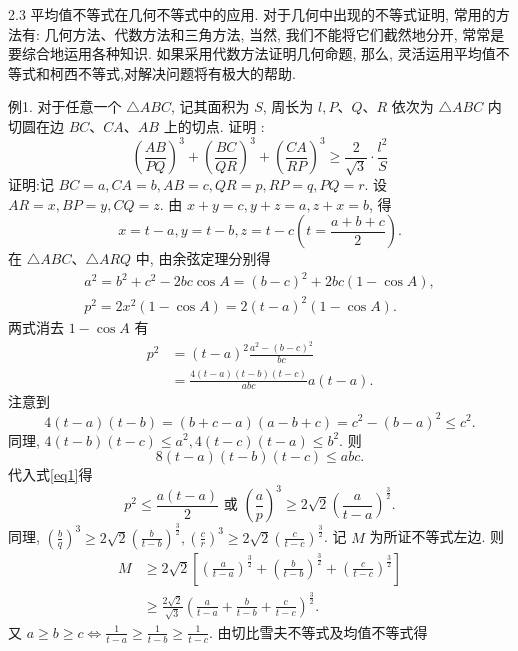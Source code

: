 
2.3 平均值不等式在几何不等式中的应用.
对于几何中出现的不等式证明, 常用的方法有: 几何方法、代数方法和三角方法, 当然, 我们不能将它们截然地分开, 常常是要综合地运用各种知识.
如果采用代数方法证明几何命题, 那么, 灵活运用平均值不等式和柯西不等式,对解决问题将有极大的帮助.



例1. 对于任意一个 $\triangle A B C$, 记其面积为 $S$, 周长为 $l, P 、 Q 、 R$ 依次为 $\triangle A B C$ 内切圆在边 $B C 、 C A 、 A B$ 上的切点.
证明 :
$$
\left(\frac{A B}{P Q}\right)^3+\left(\frac{B C}{Q R}\right)^3+\left(\frac{C A}{R P}\right)^3 \geqslant \frac{2}{\sqrt{3}} \cdot \frac{l^2}{S}
$$
证明:记 $B C=a, C A=b, A B=c, Q R=p, R P=q, P Q=r$. 设 $A R=x, B P=y, C Q=z$. 由 $x+y=c, y+z=a, z+x=b$, 得
$$
x=t-a, y=t-b, z=t-c\left(t=\frac{a+b+c}{2}\right) .
$$
在 $\triangle A B C 、 \triangle A R Q$ 中, 由余弦定理分别得
$$
\begin{gathered}
a^2=b^2+c^2-2 b c \cos A=(b-c)^2+2 b c(1-\cos A), \\
p^2=2 x^2(1-\cos A)=2(t-a)^2(1-\cos A) .
\end{gathered}
$$
两式消去 $1-\cos A$ 有
$$
\begin{aligned}
p^2 & =(t-a)^2 \frac{a^2-(b-c)^2}{b c} \\
& =\frac{4(t-a)(t-b)(t-c)}{a b c} a(t-a) . \label{eq1}
\end{aligned}
$$
注意到
$$
4(t-a)(t-b)=(b+c-a)(a-b+c)=c^2-(b-a)^2 \leqslant c^2 .
$$
同理, $4(t-b)(t-c) \leqslant a^2, 4(t-c)(t-a) \leqslant b^2$. 则
$$
8(t-a)(t-b)(t-c) \leqslant a b c .
$$
代入式\ref{eq1}得
$$
p^2 \leqslant \frac{a(t-a)}{2} \text { 或 }\left(\frac{a}{p}\right)^3 \geqslant 2 \sqrt{2}\left(\frac{a}{t-a}\right)^{\frac{3}{2}} .
$$
同理, $\left(\frac{b}{q}\right)^3 \geqslant 2 \sqrt{2}\left(\frac{b}{t-b}\right)^{\frac{3}{2}},\left(\frac{c}{r}\right)^3 \geqslant 2 \sqrt{2}\left(\frac{c}{t-c}\right)^{\frac{3}{2}}$. 记 $M$ 为所证不等式左边.
则
$$
\begin{aligned}
M & \geqslant 2 \sqrt{2}\left[\left(\frac{a}{t-a}\right)^{\frac{3}{2}}+\left(\frac{b}{t-b}\right)^{\frac{3}{2}}+\left(\frac{c}{t-c}\right)^{\frac{3}{2}}\right] \\
& \geqslant \frac{2 \sqrt{2}}{\sqrt{3}}\left(\frac{a}{t-a}+\frac{b}{t-b}+\frac{c}{t-c}\right)^{\frac{3}{2}} .
\end{aligned} \label{eq2}
$$
又 $a \geqslant b \geqslant c \Leftrightarrow \frac{1}{t-a} \geqslant \frac{1}{t-b} \geqslant \frac{1}{t-c}$.
由切比雪夫不等式及均值不等式得
